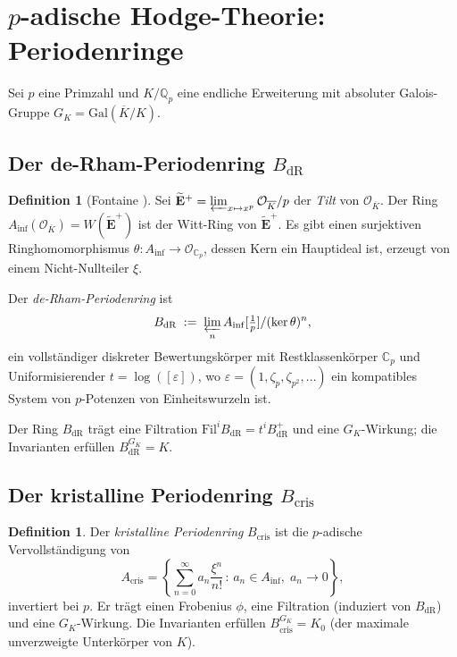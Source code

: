 \documentclass[12pt,a4paper]{amsart}
\theoremstyle{definition}
\newtheorem{definition_de}[theorem]{Definition}
\theoremstyle{remark}
\newcommand{\Gal}{\mathrm{Gal}}
\newcommand{\Qp}{\mathbb{Q}_p}
\newcommand{\BdR}{B_{\mathrm{dR}}}
\newcommand{\Bcris}{B_{\mathrm{cris}}}
\begin{document}
\section{$p$-adische Hodge-Theorie: Periodenringe}\label{sec:periodenringe}

Sei $p$ eine Primzahl und $K/\Qp$ eine endliche Erweiterung mit absoluter
Galois-Gruppe $G_K = \Gal(\overline{K}/K)$.

\subsection{Der de-Rham-Periodenring $\BdR$}

\begin{definition_de}[Fontaine \cite{Fontaine1982}]
  Sei $\widetilde{\mathbf{E}}^+ = \varprojlim_{x \mapsto x^p} \mathcal{O}_{\overline{K}}/p$
  der \emph{Tilt} von $\mathcal{O}_{\overline{K}}$. Der Ring
  $A_{\inf}(\mathcal{O}_{\overline{K}}) = W(\widetilde{\mathbf{E}}^+)$
  ist der Witt-Ring von $\widetilde{\mathbf{E}}^+$. Es gibt einen surjektiven
  Ringhomomorphismus $\theta\colon A_{\inf} \to \mathcal{O}_{\mathbb{C}_p}$,
  dessen Kern ein Hauptideal ist, erzeugt von einem Nicht-Nullteiler $\xi$.

  Der \emph{de-Rham-Periodenring} ist
  \[
    \BdR \;:=\; \varprojlim_{n} A_{\inf}[\tfrac{1}{p}] / (\ker\theta)^n,
  \]
  ein vollständiger diskreter Bewertungskörper mit Restklassenkörper $\mathbb{C}_p$
  und Uniformisierender $t = \log([\varepsilon])$, wo
  $\varepsilon = (1, \zeta_p, \zeta_{p^2},\ldots)$ ein kompatibles System von
  $p$-Potenzen von Einheitswurzeln ist.
\end{definition_de}

Der Ring $\BdR$ trägt eine Filtration
$\mathrm{Fil}^i \BdR = t^i \BdR^+$
und eine $G_K$-Wirkung; die Invarianten erfüllen $\BdR^{G_K} = K$.

\subsection{Der kristalline Periodenring $\Bcris$}

\begin{definition_de}
  Der \emph{kristalline Periodenring} $\Bcris$ ist die $p$-adische Vervollständigung von
  \[
    A_{\mathrm{cris}} = \left\{ \sum_{n=0}^\infty a_n \frac{\xi^n}{n!} \,:\,
    a_n \in A_{\inf}, \; a_n \to 0 \right\},
  \]
  invertiert bei $p$. Er trägt einen Frobenius $\phi$, eine Filtration (induziert von
  $\BdR$) und eine $G_K$-Wirkung. Die Invarianten erfüllen
  $\Bcris^{G_K} = K_0$ (der maximale unverzweigte Unterkörper von $K$).
\end{definition_de}
\end{document}
